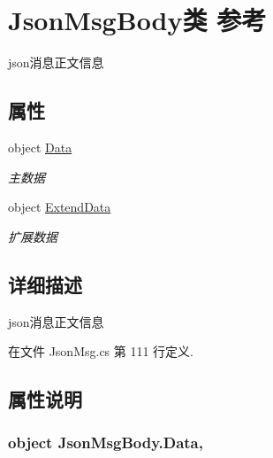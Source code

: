 \hypertarget{class_json_msg_body}{\section{Json\-Msg\-Body类 参考}
\label{class_json_msg_body}
}


json消息正文信息  


\subsection*{属性}
\begin{DoxyCompactItemize}
\item 
object \hyperlink{class_json_msg_body_a1e4b873ccf5992f43af5b6d3e14b9f30}{Data}
\begin{DoxyCompactList}\small\item\em 主数据 \end{DoxyCompactList}\item 
object \hyperlink{class_json_msg_body_a065ec25afa57ebd3ff8424d0a8b6a056}{Extend\-Data}
\begin{DoxyCompactList}\small\item\em 扩展数据 \end{DoxyCompactList}\end{DoxyCompactItemize}


\subsection{详细描述}
json消息正文信息 



在文件 Json\-Msg.\-cs 第 111 行定义.



\subsection{属性说明}
\hypertarget{class_json_msg_body_a1e4b873ccf5992f43af5b6d3e14b9f30}{
\subsubsection[{Data}]{\setlength{\rightskip}{0pt plus 5cm}object Json\-Msg\-Body.\-Data\hspace{0.3cm}{\ttfamily [get]}, {\ttfamily [set]}}}\label{class_json_msg_body_a1e4b873ccf5992f43af5b6d3e14b9f30}


